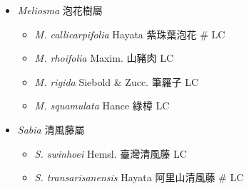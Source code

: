 
  \begin{itemize}
 \item[] \textit{Meliosma} 泡花樹屬
                                
  \begin{itemize}
        \item[] \textit{M. callicarpifolia} Hayata  紫珠葉泡花  \# LC
        \item[] \textit{M. rhoifolia} Maxim.  山豬肉   LC
        \item[] \textit{M. rigida} Siebold \& Zucc.  筆羅子   LC
        \item[] \textit{M. squamulata} Hance  綠樟   LC
  \end{itemize}
 \item[] \textit{Sabia} 清風藤屬
                                
  \begin{itemize}
        \item[] \textit{S. swinhoei} Hemsl.  臺灣清風藤   LC
        \item[] \textit{S. transarisanensis} Hayata  阿里山清風藤  \# LC
  \end{itemize}
  \end{itemize}
